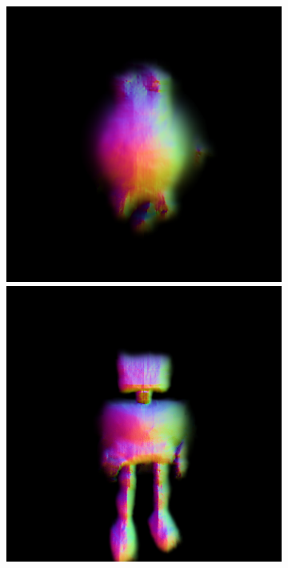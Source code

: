 \begin{figure}[H]
    \centering
    \begin{subfigure}[b]{0.20\textwidth}
        \centering
        \fontsize{9pt}{7pt}\selectfont{}\vspace{3cm}
        \fontsize{9pt}{7pt}\selectfont{}\vspace{2.85cm}
        \fontsize{9pt}{7pt}\selectfont{}\vspace{1.95cm}
    \end{subfigure}
    \begin{subfigure}[b]{0.20\textwidth}
        \centering
        \includegraphics[width=\textwidth]{figures/generationProcess/dreamfusion_plantrobot_1_part2.png}
        \includegraphics[width=\textwidth]{figures/generationProcess/dreamfusion_plantrobot_5000_part2.png}

\end{subfigure}
\end{figure}
